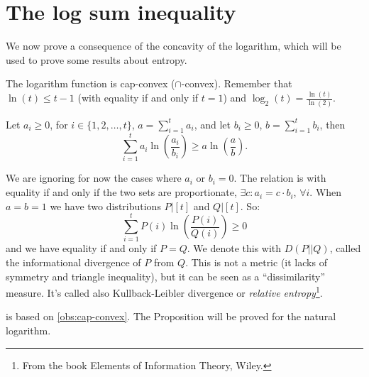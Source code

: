 \chapter{The log sum inequality}

We now prove a consequence of the concavity of the logarithm, which will be used to prove some results about entropy.

\begin{obs} \label{obs:cap-convex}
	The logarithm function is cap-convex ($\cap$-convex).
	Remember that $\ln(t) \le t - 1$ (with equality if and only if $t=1$) and $\log_2(t) = \frac{\ln(t)}{\ln(2)}$.
\end{obs}

\begin{prop}\label{prop:logsum}
	Let $a_i \ge 0$, for $i \in \{1, 2, \dots, t\}$, $a = \sum_{i = 1}^t a_i$, and let $b_i \ge 0$, $b = \sum_{i = 1}^t b_i$, then 
	\begin{equation*}
		\sum_{i = 1}^t a_i \ln \left( \frac{a_i}{b_i} \right)
		\ge
		a \ln \left( \frac{a}{b} \right).
	\end{equation*}
\end{prop}

We are ignoring for now the cases where $a_i$ or $b_i = 0$.
The relation is with equality if and only if the two sets are proportionate, \ie $\exists c : a_i = c \cdot b_i$, $\forall i$.
When $a = b = 1$ we have two distributions $P|[t]$ and $Q|[t]$.
So:
\begin{equation*}
	\sum_{i = 1}^t P(i) \ln \left( \frac{P(i)}{Q(i)} \right) \ge 0
\end{equation*}
and we have equality if and only if $P = Q$.
We denote this with $D(P||Q)$, called the informational divergence of $P$ from $Q$.
This is not a metric (it lacks of symmetry and triangle inequality), but it can be seen as a ``dissimilarity'' measure.
It's called also Kullback-Leibler divergence or \emph{relative entropy}\footnote{From the book Elements of Information Theory, Wiley.}. 
 
  is based on \cref{obs:cap-convex}.
 The Proposition will be proved for the natural logarithm.
 
